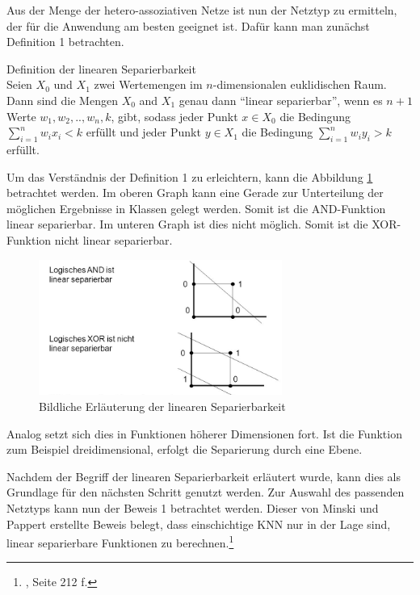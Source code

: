 Aus der Menge der hetero-assoziativen Netze ist nun der Netztyp zu ermitteln, der für die Anwendung am besten geeignet ist. Dafür kann man zunächst Definition 1 betrachten.

\begin{defi}Definition der linearen Separierbarkeit\\
Seien $X_{0}$ und $X_{1}$ zwei Wertemengen im $n$-dimensionalen euklidischen Raum. Dann sind die Mengen $X_{0}$ and $X_{1}$ genau dann  "`linear separierbar"', wenn es  $n+1$ Werte $w_{1}, w_{2},..,w_{n}, k$, gibt, sodass jeder Punkt  $x \in X_{0}$ die Bedingung $\sum^{n}_{i=1} w_{i}x_{i} < k$ erfüllt und jeder Punkt $y \in X_{1}$ die Bedingung $\sum^{n}_{i=1} w_{i}y_{i} > k$ erfüllt.
\end{defi}

Um das Verständnis der Definition 1 zu erleichtern, kann die Abbildung \ref{fig:Bildliche Erläuterung der linearen Separierbarkeit} betrachtet werden. Im oberen Graph kann eine Gerade zur Unterteilung der möglichen Ergebnisse in Klassen gelegt werden. Somit ist die AND-Funktion linear separierbar. Im unteren Graph ist dies nicht möglich. Somit ist die XOR-Funktion nicht linear separierbar.  

\begin{figure}[H]
\centering
		\includegraphics[width=0.71\textwidth]{Bilder/Konzeption/Linear_Sep.PNG}
	\caption{Bildliche Erläuterung der linearen Separierbarkeit}
	\label{fig:Bildliche Erläuterung der linearen Separierbarkeit}
\end{figure}

Analog setzt sich dies in Funktionen höherer Dimensionen fort. Ist die Funktion zum Beispiel dreidimensional, erfolgt die Separierung durch eine Ebene.

Nachdem der Begriff der linearen Separierbarkeit erläutert wurde, kann dies als Grundlage für den nächsten Schritt genutzt werden. Zur Auswahl des passenden Netztyps kann nun der Beweis 1 betrachtet werden. Dieser von Minski und Pappert erstellte Beweis  belegt, dass einschichtige KNN nur in der Lage sind, linear separierbare Funktionen zu berechnen.\footnote{\Vgl{}, Seite 212 f.}

